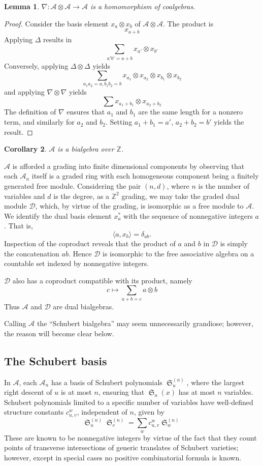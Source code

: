 \documentclass[a4paper,fleqn]{cas-sc}
\newtheorem{lemma}{Lemma}[subsection]
\newtheorem{corollary}[lemma]{Corollary}
\theoremstyle{definition}
\theoremstyle{remark}
\numberwithin{equation}{subsection}
\DeclareMathOperator{\sch}{\mathfrak{S}}
\newcommand{\coma}{\mathcal{A}}
\newcommand{\dcoma}{\mathcal{D}}
\begin{document}
\begin{lemma}
	$\nabla:\coma\otimes \coma\to \coma$ is a homomorphism of coalgebras.
\end{lemma}
\begin{proof}
  Consider the basis element $x_a\otimes x_b$ of $\coma\otimes \coma$. The product is
  $$x_{a+b}$$
  Applying $\Delta$ results in
$$\sum_{a'b'=a+b} x_{a'}\otimes x_{b'}$$
Conversely, applying $\Delta\otimes \Delta$ yields
$$\sum_{a_1a_2=a,b_1b_2=b}x_{a_1}\otimes x_{a_2}\otimes x_{b_1}\otimes x_{b_2}$$
and applying $\nabla\otimes \nabla$ yields
$$\sum x_{a_1 + b_1}\otimes x_{a_2 + b_2}$$
The definition of $\nabla$ ensures that $a_1$ and $b_1$ are the same length for a nonzero term, and similarly for $a_2$ and $b_2$. Setting $a_1+b_1=a'$, $a_2+b_2=b'$ yields the result.
\end{proof}

\begin{corollary}
	$\coma$ is a bialgebra over $\mathbb{Z}$.
\end{corollary}

$\coma$ is afforded a grading into finite dimensional components by observing that each $\coma_n$ itself is a graded ring with each homogeneous component being a finitely generated free module. Considering the pair $(n, d)$, where $n$ is the number of variables and $d$ is the degree, as a $\mathbb{Z}^2$ grading, we may take the graded dual module $\dcoma$, which, by virtue of the grading, is isomorphic as a free module to $\coma$. We identify the dual basis element $x_a^*$ with the sequence of nonnegative integers $a$. That is,
$$\langle a, x_b\rangle = \delta_{ab}\text{.}$$
Inspection of the coproduct reveals that the product of $a$ and $b$ in $\dcoma$ is simply the concatenation $ab$. Hence $\dcoma$ is isomorphic to the free associative algebra on a countable set indexed by nonnegative integers.

$\dcoma$ also has a coproduct compatible with its product, namely
$$c\mapsto \sum_{a+b=c} a\otimes b$$
Thus $\coma$ and $\dcoma$ are dual bialgebras.

Calling $\coma$ the ``Schubert bialgebra'' may seem unnecessarily grandiose; however, the reason will become clear below.

\subsection{The Schubert basis}

In $\coma$, each $\coma_n$ has a basis of Schubert polynomials $\sch_u^{(n)}$, where the largest right descent of $u$ is at most $n$, ensuring that $\sch_u(x)$ has at most $n$ variables. Schubert polynomials limited to a specific number of variables have well-defined structure constants $c_{u,v}^w$, independent of $n$, given by
$$\sch_u^{(n)}\sch_v^{(n)} = \sum_{w}c_{u,v}^w\sch_w^{(n)}$$
These are known to be nonnegative integers by virtue of the fact that they count points of transverse intersections of generic translates of Schubert varieties; however, except in special cases no positive combinatorial formula is known.
\end{document}
